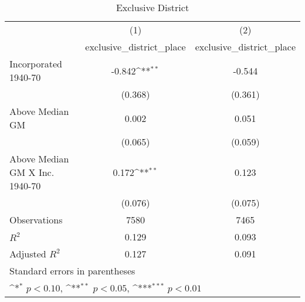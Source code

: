 \begin{table}[htbp]\centering
\def\sym#1{\ifmmode^{#1}\else\(^{#1}\)\fi}
\caption{Exclusive District}
\begin{tabular}{l*{2}{c}}
\hline\hline
                    &\multicolumn{1}{c}{(1)}&\multicolumn{1}{c}{(2)}\\
                    &\multicolumn{1}{c}{exclusive\_district\_place}&\multicolumn{1}{c}{exclusive\_district\_place}\\
\hline
Incorporated 1940-70&      -0.842\sym{**} &      -0.544         \\
                    &     (0.368)         &     (0.361)         \\
[1em]
Above Median GM     &       0.002         &       0.051         \\
                    &     (0.065)         &     (0.059)         \\
[1em]
Above Median GM X Inc. 1940-70&       0.172\sym{**} &       0.123         \\
                    &     (0.076)         &     (0.075)         \\
\hline
Observations        &        7580         &        7465         \\
\(R^{2}\)           &       0.129         &       0.093         \\
Adjusted \(R^{2}\)  &       0.127         &       0.091         \\
\hline\hline
\multicolumn{3}{l}{\footnotesize Standard errors in parentheses}\\
\multicolumn{3}{l}{\footnotesize \sym{*} \(p<0.10\), \sym{**} \(p<0.05\), \sym{***} \(p<0.01\)}\\
\end{tabular}
\end{table}

